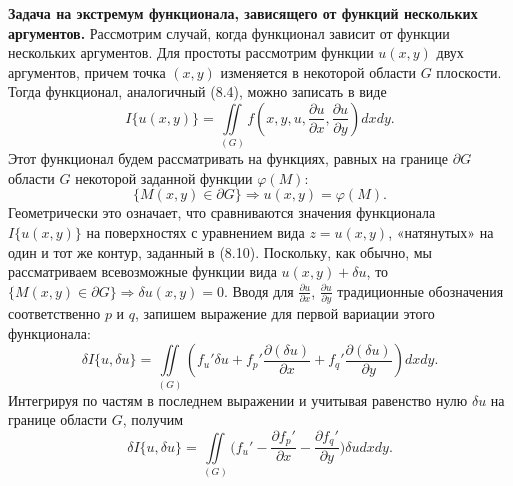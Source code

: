 	{\bf Задача на экстремум функционала, зависящего от функций нескольких аргументов.} Рассмотрим случай, когда функционал зависит от функции нескольких аргументов. Для простоты рассмотрим функции $u(x,y)$ двух аргументов, причем точка $(x, y)$ изменяется в некоторой области $G$ плоскости. Тогда функционал, аналогичный (8.4), можно записать в виде
	\begin{equation}
		\label{equation_8_9}
		I\{u(x,y)\}=\iint\limits_{(G)}f(x,y,u, \frac{\partial u}{\partial x}, \frac{\partial u}{\partial y})dxdy.
	\end{equation}
	Этот функционал будем рассматривать на функциях, равных на границе $\partial G$ области $G$ некоторой заданной функции $\varphi(M)$:
	\begin{equation}
	\label{equation_8_10}
	\{M(x,y)\in \partial G\} \Rightarrow u(x,y)=\varphi(M).
	\end{equation}
	Геометрически это означает, что сравниваются значения функционала $I\{u(x,y)\}$ на поверхностях с уравнением вида $z=u(x,y)$, «натянутых» на один и тот же контур, заданный в (8.10). Поскольку, как обычно, мы рассматриваем всевозможные функции вида \hfill $u(x,y)+\delta u$, \hfill то\\ $\{M(x,y)\in \partial G\}\Rightarrow \delta u(x,y)=0$. Вводя для $\frac{\partial u}{\partial x}$, $\frac{\partial u}{\partial y}$ традиционные обозначения соответственно $p$ и $q$, запишем выражение для первой вариации этого функционала:
	$$\delta I\{u, \delta u\}= \iint\limits_{(G)}(f_u'\delta u + f_p'\frac{\partial (\delta u)}{\partial x} + f_q'\frac{\partial (\delta u)}{\partial y})dxdy.$$
	Интегрируя по частям в последнем выражении и учитывая равенство нулю $\delta u$ на границе области $G$, получим
	$$\delta I\{u, \delta u\}= \iint\limits_{(G)}\Big(f_u' - \frac{\partial f_p'}{\partial x}  - \frac{\partial f_q'}{\partial y}\Big)\delta udxdy.$$


